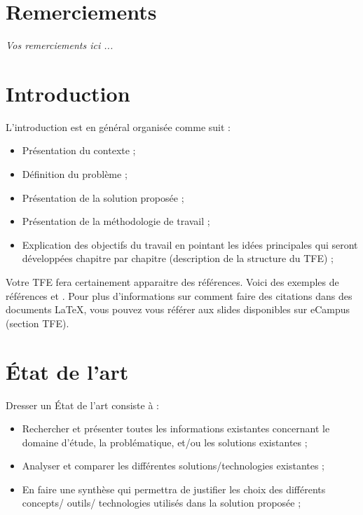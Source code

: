 \documentclass{HELBreport}
\begin{document}

\pagestyle{fancy} %
\chapter*{Remerciements}

\textit{Vos remerciements ici ...}

\tableofcontents

\chapter{Introduction}


L’introduction est en général organisée comme suit :
\begin{itemize}
    \item Présentation du contexte ;
    \item Définition du problème ;
    \item Présentation de la solution proposée ;
    \item Présentation de la méthodologie de travail ;
    \item Explication des objectifs du travail en pointant les idées principales qui seront développées chapitre par chapitre (description de la structure du TFE) ;
\end{itemize} 

Votre TFE fera certainement apparaitre des références. Voici des exemples de références \cite{carter2010back} et \cite{github}. Pour plus d’informations sur comment faire des citations dans des documents LaTeX, vous pouvez vous référer aux slides disponibles sur eCampus (section TFE).

\chapter{État de l’art}

Dresser un État de l'art consiste à : 
\begin{itemize}
    \item Rechercher et présenter toutes les informations existantes concernant le domaine d’étude, la problématique, et/ou les solutions existantes ;
    \item Analyser et comparer les différentes solutions/technologies existantes ;
    \item  En faire une synthèse qui permettra de justifier les choix des différents concepts/ outils/ technologies utilisés dans la solution proposée ;
\end{itemize} 
\end{document}
